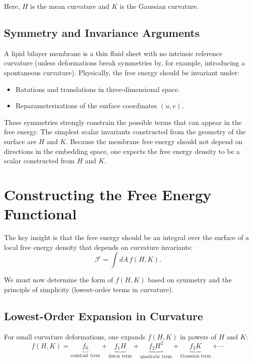 \documentclass[12pt,a4paper]{article}
\begin{document}
Here, $H$ is the mean curvature and $K$ is the Gaussian curvature.

\subsection{Symmetry and Invariance Arguments}

A lipid bilayer membrane is a thin fluid sheet with no intrinsic reference curvature (unless deformations break symmetries by, for example, introducing a spontaneous curvature). Physically, the free energy should be invariant under:
\begin{itemize}
    \item Rotations and translations in three-dimensional space.
    \item Reparameterizations of the surface coordinates $(u,v)$.
\end{itemize}

These symmetries strongly constrain the possible terms that can appear in the free energy. The simplest scalar invariants constructed from the geometry of the surface are $H$ and $K$. Because the membrane free energy should not depend on directions in the embedding space, one expects the free energy density to be a scalar constructed from $H$ and $K$.

\section{Constructing the Free Energy Functional}

The key insight is that the free energy should be an integral over the surface of a local free energy density that depends on curvature invariants:
\[
\mathcal{F} = \int dA \, f(H,K).
\]

We must now determine the form of $f(H,K)$ based on symmetry and the principle of simplicity (lowest-order terms in curvature).

\subsection{Lowest-Order Expansion in Curvature}

For small curvature deformations, one expands $f(H,K)$ in powers of $H$ and $K$:
\[
f(H,K) = \underbrace{f_0}_{\text{constant term}} + \underbrace{f_1 H}_{\text{linear term}} + \underbrace{f_2 H^2}_{\text{quadratic term}} + \underbrace{f_3 K}_{\text{Gaussian term}} + \cdots
\]
\end{document}
